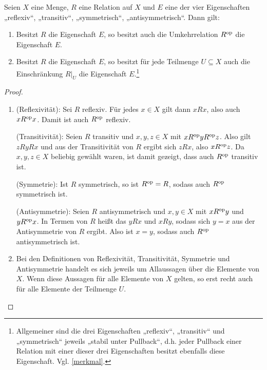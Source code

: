 \begin{satz} \label{releigstabil}
    Seien $X$ eine Menge, $R$ eine Relation auf $X$ und $E$ eine der vier Eigenschaften „reflexiv“, „transitiv“, „symmetrisch“, „antisymmetrisch“. Dann gilt:
    \begin{enumerate}
        \item Besitzt $R$ die Eigenschaft $E$, so besitzt auch die Umkehrrelation $R^{\mathrm{op}}$ die Eigenschaft $E$.
        \item Besitzt $R$ die Eigenschaft $E$, so besitzt für jede Teilmenge $U\subseteq X$ auch die Einschränkung $R\vert_U$ die Eigenschaft $E$.\footnote{Allgemeiner sind die drei Eigenschaften „reflexiv“, „transitiv“ und „symmetrisch“ jeweils „stabil unter Pullback“, d.h. jeder Pullback einer Relation mit einer dieser drei Eigenschaften besitzt ebenfalls diese Eigenschaft. Vgl. \cref{merkmal}.}
    \end{enumerate}
\end{satz}
\begin{proof} \quad
    \begin{enumerate}
        \item (Reflexivität): Sei $R$ reflexiv. Für jedes $x\in X$ gilt dann  $xRx$, also auch $xR^{\mathrm{op}} x$. Damit ist auch $R^{\mathrm{op}}$ reflexiv.

        (Transitivität): Seien $R$ transitiv und $x,y,z\in X$ mit $xR^{\mathrm{op}} yR^{\mathrm{op}} z$. Also gilt $zRyRx$ und aus der Transitivität von $R$ ergibt sich $zRx$, also $xR^{\mathrm{op}} z$. Da $x,y,z\in X$ beliebig gewählt waren, ist damit gezeigt, dass auch $R^{\mathrm{op}}$ transitiv ist.

        (Symmetrie): Ist $R$ symmetrisch, so ist $R^{\mathrm{op}}=R$, sodass auch $R^{\mathrm{op}}$ symmetrisch ist.

        (Antisymmetrie): Seien $R$ antisymmetrisch und $x,y\in X$ mit $x R^{\mathrm{op}} y$ und $y R^{\mathrm{op}} x$. In Termen von $R$ heißt das $y Rx$ und $x Ry$, sodass sich $y=x$ aus der Antisymmetrie von $R$ ergibt. Also ist $x=y$, sodass auch $R^{\mathrm{op}}$ antisymmetrisch ist.
        \item Bei den Definitionen von Reflexivität, Transitivität, Symmetrie und Antisymmetrie handelt es sich jeweils um Allaussagen über die Elemente von $X$. Wenn diese Aussagen für alle Elemente von $X$ gelten, so erst recht auch für alle Elemente der Teilmenge $U$. \qedhere
    \end{enumerate}
\end{proof}





